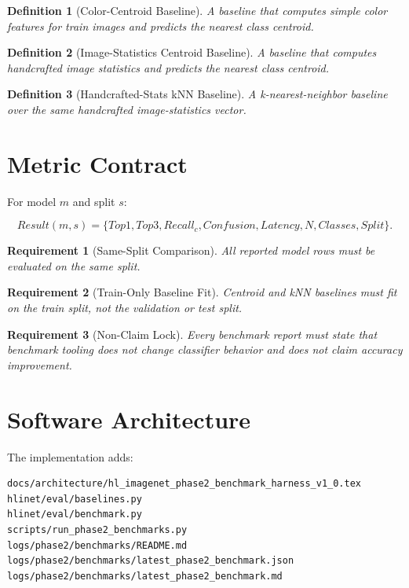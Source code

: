 \documentclass[12pt]{article}
\newtheorem{definition}{Definition}
\newtheorem{requirement}{Requirement}
\begin{document}
\begin{definition}[Color-Centroid Baseline]
A baseline that computes simple color features for train images and predicts
the nearest class centroid.
\end{definition}

\begin{definition}[Image-Statistics Centroid Baseline]
A baseline that computes handcrafted image statistics and predicts the nearest
class centroid.
\end{definition}

\begin{definition}[Handcrafted-Stats kNN Baseline]
A k-nearest-neighbor baseline over the same handcrafted image-statistics vector.
\end{definition}

\section{Metric Contract}

For model \(m\) and split \(s\):

\[
Result(m,s)
=
\{
Top1,
Top3,
Recall_c,
Confusion,
Latency,
N,
Classes,
Split
\}.
\]

\begin{requirement}[Same-Split Comparison]
All reported model rows must be evaluated on the same split.
\end{requirement}

\begin{requirement}[Train-Only Baseline Fit]
Centroid and kNN baselines must fit on the train split, not the validation or
test split.
\end{requirement}

\begin{requirement}[Non-Claim Lock]
Every benchmark report must state that benchmark tooling does not change
classifier behavior and does not claim accuracy improvement.
\end{requirement}

\section{Software Architecture}

The implementation adds:

\begin{lstlisting}
docs/architecture/hl_imagenet_phase2_benchmark_harness_v1_0.tex
hlinet/eval/baselines.py
hlinet/eval/benchmark.py
scripts/run_phase2_benchmarks.py
logs/phase2/benchmarks/README.md
logs/phase2/benchmarks/latest_phase2_benchmark.json
logs/phase2/benchmarks/latest_phase2_benchmark.md
\end{lstlisting}
\end{document}
